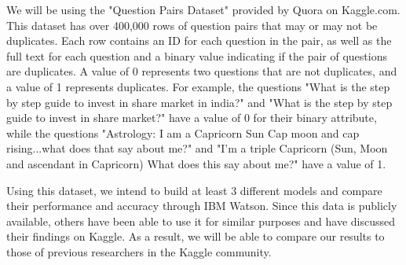 \documentclass{sig-alternate}
\begin{document}
We will be using the "Question Pairs Dataset" provided by Quora on Kaggle.com.\cite{quora:kaggle} This dataset has over 400,000 rows of question pairs that may or may not be duplicates. Each row contains an ID for each question in the pair, as well as the full text for each question and a binary value indicating if the pair of questions are duplicates. A value of 0 represents two questions that are not duplicates, and a value of 1 represents duplicates. For example, the questions "What is the step by step guide to invest in share market in india?" and "What is the step by step guide to invest in share market?" have a value of 0 for their binary attribute, while the questions "Astrology: I am a Capricorn Sun Cap moon and cap rising...what does that say about me?" and "I'm a triple Capricorn (Sun, Moon and ascendant in Capricorn) What does this say about me?" have a value of 1.

Using this dataset, we intend to build at least 3 different models and compare their performance and accuracy through IBM Watson. Since this data is publicly available, others have been able to use it for similar purposes and have discussed their findings on Kaggle. As a result, we will be able to compare our results to those of previous researchers in the Kaggle community.



\balance
\end{document}
